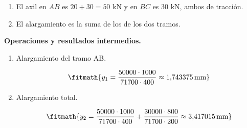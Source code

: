 \begin{enumerate}

\item El axil en $AB$ es $20 + 30 = 50$ kN y en $BC$ es $30$ kN, ambos de tracción.

\item El alargamiento es la suma de los de los dos tramos.

\end{enumerate}

\noindent\textbf{Operaciones y resultados intermedios.}

\begin{enumerate}

\item Alargamiento del tramo AB.

\[\fitmath{y_{1}=\frac{50000\cdot 1000}{71700\cdot 400}\approx 1{,}743375\,\mathrm{mm}}\]

\item Alargamiento total.

\[\fitmath{y_{2}=\frac{50000\cdot 1000}{71700\cdot 400}+\frac{30000\cdot 800}{71700\cdot 200}\approx 3{,}417015\,\mathrm{mm}}\]

\end{enumerate}
